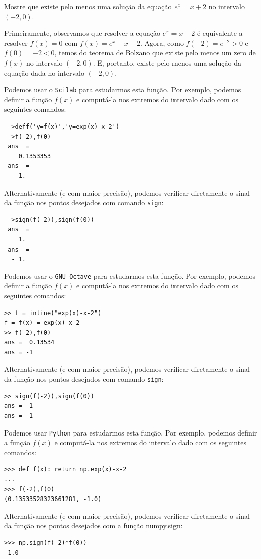 \begin{ex}\label{ex:teorema_de_Bolzano}
Mostre que existe pelo menos uma solução da equação $e^x=x+2$ no intervalo $(-2,0)$.
\end{ex}
\begin{sol}
Primeiramente, observamos que resolver a equação $e^x = x+2$ é equivalente a resolver $f(x) = 0$ com $f(x)=e^x-x-2$. Agora, como $f(-2)=e^{-2}>0$ e $f(0)=-2<0$, temos do teorema de Bolzano que existe pelo menos um zero de $f(x)$ no intervalo $(-2, 0)$. E, portanto, existe pelo menos uma solução da equação dada no intervalo $(-2, 0)$.

\ifisscilab
Podemos usar o \verb+Scilab+ para estudarmos esta função. Por exemplo, podemos definir a função $f(x)$ e computá-la nos extremos do intervalo dado com os seguintes comandos:
\begin{verbatim}
-->deff('y=f(x)','y=exp(x)-x-2')
-->f(-2),f(0)
 ans  =
    0.1353353  
 ans  =
  - 1.  
\end{verbatim}
Alternativamente (e com maior precisão), podemos verificar diretamente o sinal da função nos pontos desejados com comando \verb+sign+:
\begin{verbatim}
-->sign(f(-2)),sign(f(0))
 ans  =
    1.  
 ans  =
  - 1.  
\end{verbatim}
\fi
\ifisoctave
Podemos usar o \verb+GNU Octave+ para estudarmos esta função. Por exemplo, podemos definir a função $f(x)$ e computá-la nos extremos do intervalo dado com os seguintes comandos:
\begin{verbatim}
>> f = inline("exp(x)-x-2")
f = f(x) = exp(x)-x-2
>> f(-2),f(0)
ans =  0.13534
ans = -1
\end{verbatim}
Alternativamente (e com maior precisão), podemos verificar diretamente o sinal da função nos pontos desejados com comando \verb+sign+:
\begin{verbatim}
>> sign(f(-2)),sign(f(0))
ans =  1
ans = -1
\end{verbatim}
\fi
\ifispython
Podemos usar \verb+Python+ para estudarmos esta função. Por exemplo, podemos definir a função $f(x)$ e computá-la nos extremos do intervalo dado com os seguintes comandos:
\begin{verbatim}
>>> def f(x): return np.exp(x)-x-2
... 
>>> f(-2),f(0)
(0.13533528323661281, -1.0)
\end{verbatim}
Alternativamente (e com maior precisão), podemos verificar diretamente o sinal da função nos pontos desejados com a função \href{https://docs.scipy.org/doc/numpy/reference/generated/numpy.sign.html?highlight=numpy.sign#numpy.sign}{numpy.sign}:
\begin{verbatim}
>>> np.sign(f(-2)*f(0))
-1.0
\end{verbatim}
\fi
\end{sol}


